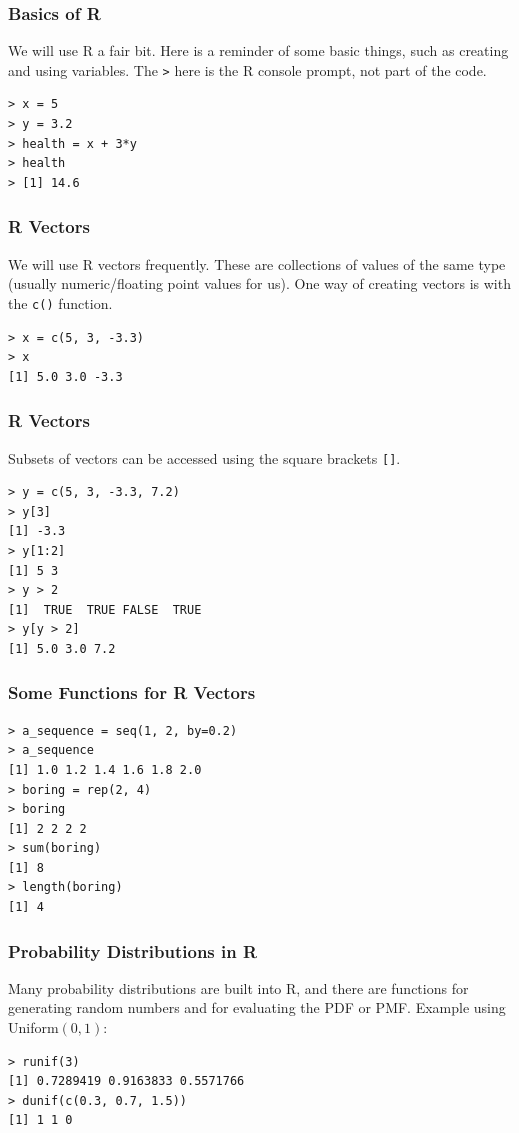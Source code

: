 \documentclass{beamer}
\begin{document}
\begin{frame}[fragile]
\frametitle{Basics of R}
We will use R a fair bit. Here is a reminder of some basic
things, such as creating and using variables. The \texttt{>}
here is the R console prompt, not part of the code.
\begin{verbatim}
> x = 5
> y = 3.2
> health = x + 3*y
> health
> [1] 14.6
\end{verbatim}

\end{frame}

\begin{frame}[fragile]
\frametitle{R Vectors}
We will use R vectors frequently. These are collections of values of the
same type (usually numeric/floating point values for us).
One way of creating vectors is with the \texttt{c()} function.
\begin{verbatim}
> x = c(5, 3, -3.3)
> x
[1] 5.0 3.0 -3.3
\end{verbatim}
\end{frame}

\begin{frame}[fragile]
\frametitle{R Vectors}
Subsets of vectors can be accessed using the square brackets
\texttt{[]}.
\begin{verbatim}
> y = c(5, 3, -3.3, 7.2)
> y[3]
[1] -3.3
> y[1:2]
[1] 5 3
> y > 2
[1]  TRUE  TRUE FALSE  TRUE
> y[y > 2]
[1] 5.0 3.0 7.2
\end{verbatim}
\end{frame}

\begin{frame}[fragile]
\frametitle{Some Functions for R Vectors}
\begin{verbatim}
> a_sequence = seq(1, 2, by=0.2)
> a_sequence
[1] 1.0 1.2 1.4 1.6 1.8 2.0
> boring = rep(2, 4)
> boring
[1] 2 2 2 2
> sum(boring)
[1] 8
> length(boring)
[1] 4
\end{verbatim}
\end{frame}


\begin{frame}[fragile]
\frametitle{Probability Distributions in R}
Many probability distributions are built into R, and there
are functions for generating random numbers and for evaluating
the PDF or PMF. Example using Uniform$(0, 1)$:
\begin{verbatim}
> runif(3)
[1] 0.7289419 0.9163833 0.5571766
> dunif(c(0.3, 0.7, 1.5))
[1] 1 1 0
\end{verbatim}
\end{frame}
\end{document}

